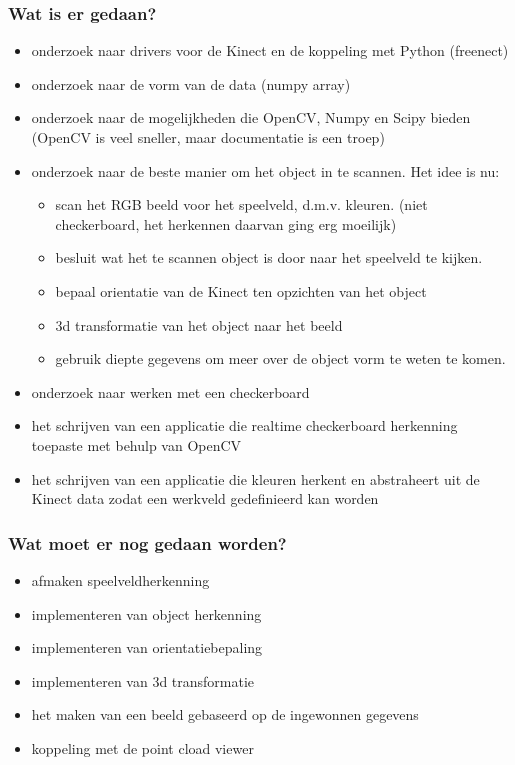 \documentclass[10pt,a4paper]{article}
\begin{document}
\subsubsection{Wat is er gedaan?}
\begin{itemize}
\item onderzoek naar drivers voor de Kinect en de koppeling met Python (freenect)
\item onderzoek naar de vorm van de data (numpy array)
\item onderzoek naar de mogelijkheden die OpenCV, Numpy en Scipy bieden (OpenCV is veel sneller, maar documentatie is een troep)
\item onderzoek naar de beste manier om het object in te scannen. Het idee is nu:
\begin{itemize}
\item scan het RGB beeld voor het speelveld, d.m.v. kleuren. (niet checkerboard, het herkennen daarvan ging erg moeilijk)
\item besluit wat het te scannen object is door naar het speelveld te kijken.
\item bepaal orientatie van de Kinect ten opzichten van het object
\item 3d transformatie van het object naar het beeld
\item gebruik diepte gegevens om meer over de object vorm te weten te komen. 
\end{itemize}
\item onderzoek naar werken met een checkerboard
\item het schrijven van een applicatie die realtime checkerboard herkenning toepaste met behulp van OpenCV
\item het schrijven van een applicatie die kleuren herkent en abstraheert uit de Kinect data zodat een werkveld gedefinieerd kan worden
\end{itemize}
\subsubsection{Wat moet er nog gedaan worden?}
\begin{itemize}
\item afmaken speelveldherkenning
\item implementeren van object herkenning
\item implementeren van orientatiebepaling
\item implementeren van 3d transformatie
\item het maken van een beeld gebaseerd op de ingewonnen gegevens
\item koppeling met de point cload viewer
\end{itemize}
\end{document}
